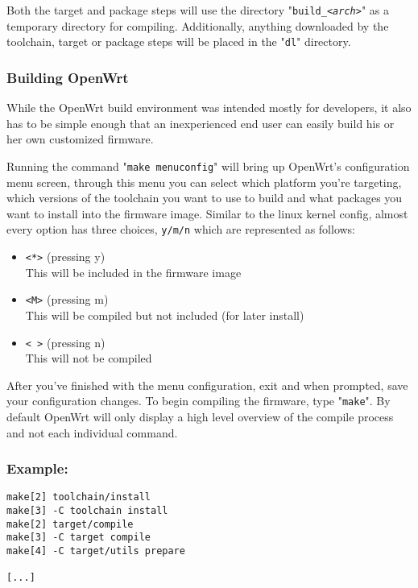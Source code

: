 Both the target and package steps will use the directory "\texttt{build\_\textit{<arch>}}"
as a temporary directory for compiling. Additionally, anything downloaded by the toolchain,
target or package steps will be placed in the "\texttt{dl}" directory.


\subsubsection{Building OpenWrt}

While the OpenWrt build environment was intended mostly for developers, it also has to be
simple enough that an inexperienced end user can easily build his or her own customized firmware.

Running the command "\texttt{make menuconfig}" will bring up OpenWrt's configuration menu
screen, through this menu you can select which platform you're targeting, which versions of
the toolchain you want to use to build and what packages you want to install into the
firmware image. Similar to the linux kernel config, almost every option has three choices,
\texttt{y/m/n} which are represented as follows:

\begin{itemize}
    \item{\texttt{<*>} (pressing y)} \\
        This will be included in the firmware image
    \item{\texttt{<M>} (pressing m)} \\
        This will be compiled but not included (for later install)
    \item{\texttt{< >} (pressing n)} \\
        This will not be compiled
\end{itemize}

After you've finished with the menu configuration, exit and when prompted, save your
configuration changes. To begin compiling the firmware, type "\texttt{make}". By default
OpenWrt will only display a high level overview of the compile process and not each individual
command.

\subsubsection{Example:}

\begin{Verbatim}
make[2] toolchain/install
make[3] -C toolchain install
make[2] target/compile
make[3] -C target compile
make[4] -C target/utils prepare

[...]
\end{Verbatim}

